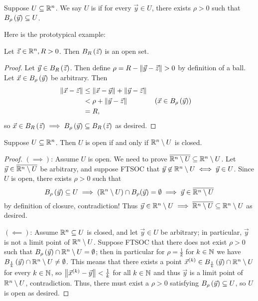 \documentclass[main.tex]{subfiles}
\begin{document}
\begin{definition}
    Suppose $U\subseteq \mathbb R^n$. We say $U$ is  if for every $\vec{y}\in U$, there exists $\rho > 0$ such that $B_\rho\left( \vec{y} \right) \subseteq U$.
\end{definition}

Here is the prototypical example:

\begin{proposition}
    Let $\vec{z}\in \mathbb R^n, R > 0$. Then $B_R\left( \vec{z} \right)$ is an open set.
\end{proposition}

\begin{proof}
    Let $\vec{y}\in B_R\left( \vec{z} \right)$. Then define $\rho = R - \left\lVert \vec{y} - \vec{z} \right\rVert > 0$ by definition of a ball. Let $\vec{x}\in B_\rho\left( \vec{y} \right)$ be arbitrary. Then
    \begin{align*}
        \left\lVert \vec{x} - \vec{z} \right\rVert &\le \left\lVert \vec{x} - \vec{y} \right\rVert + \left\lVert \vec{y} - \vec{z} \right\rVert \\
        &< \rho + \left\lVert \vec{y} - \vec{z} \right\rVert && \left( \vec{x}\in B_\rho\left( \vec{y} \right) \right) \\
        &= R,
    \end{align*}
    so $\vec{x} \in B_R\left( \vec{z} \right)\implies B_\rho\left( \vec{y} \right)\subseteq B_R\left( \vec{z} \right)$ as desired.
\end{proof}

\begin{lemma}
    Suppose $U\subseteq \mathbb R^n$. Then $U$ is open if and only if $\mathbb R^n\setminus U$ is closed.
\end{lemma}

\begin{proof}
    $(\implies)$: Assume $U$ is open. We need to prove $\overline{\mathbb R^n \setminus U}\subseteq \mathbb R^n\setminus U$. Let $\vec{y}\in \overline{\mathbb R^n \setminus U}$ be arbitrary, and suppose FTSOC that $\vec{y}\not\in \mathbb R^n\setminus U\iff \vec{y}\in U$. Since $U$ is open, there exists $\rho > 0$ such that 
    \[B_\rho \left( \vec{y} \right)\subseteq U\implies (\mathbb R^n \setminus U) \cap B_\rho (\vec{y}) = \emptyset\implies \vec{y} \in \overline{\mathbb R^n \setminus U}\] by definition of closure, contradiction! Thus $\vec{y}\in \mathbb R^n \setminus U\implies \overline{\mathbb R^n \setminus U}\subseteq \mathbb R^n \setminus U$ as desired.

    $(\impliedby)$: Assume $\mathbb R^n\subseteq U$ is closed, and let $\vec{y}\in U$ be arbitrary; in particular, $\vec{y}$ is not a limit point of $\mathbb R^n \setminus U$. Suppose FTSOC that there does not exist $\rho > 0$ such that $B_\rho\left( \vec{y} \right) \cap \mathbb R^n\setminus U = \emptyset$; then in particular for $\rho = \frac{1}{k}$ for $k\in \mathbb N$ we have $B_{\frac{1}{k}}\left( \vec{y} \right)\cap \mathbb R^n \setminus U\neq \emptyset$. This means that there exists a point $\vec{x}^{(k)}\in B_{\frac{1}{k}}\left( \vec{y} \right)\cap \mathbb R^n \setminus U$ for every $k\in \mathbb N$, so $\left\lVert \vec{x}^{(k)} - \vec{y} \right\rVert < \frac{1}{k}$ for all $k\in \mathbb N$ and thus $\vec{y}$ is a limit point of $\mathbb R^n \setminus U$, contradiction. Thus, there must exist a $\rho > 0$ satisfying $B_\rho\left( \vec{y} \right) \subseteq U$, so $U$ is open as desired.
\end{proof}
\end{document}
